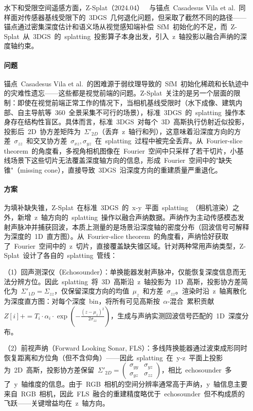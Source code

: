 水下和受限空间遥感方面，Z-Splat（2024.04）~\cite{2404_04687} 与锚点~Casadesus Vila et al.~同样面对传感器基线受限下的~3DGS~几何退化问题，但采取了截然不同的路径——锚点通过密集深度估计和语义场从视觉感知端补偿~SfM~初始化的不足，而~Z-Splat~从~3DGS~的~splatting~投影算子本身出发，引入~z~轴投影以融合声纳的深度轴约束。

\paragraph{问题}锚点~Casadesus Vila et al.~的困难源于弱纹理导致的~SfM~初始化稀疏和长轨迹中的灾难性遗忘——这些都是视觉前端的问题。Z-Splat~关注的是另一个层面的限制：即使在视觉前端正常工作的情况下，当相机基线受限时（水下成像、建筑内部、自主导航等~360\textdegree{}~全景采集不可行的场景），标准~3DGS~的~splatting~操作本身存在结构性盲区。具体而言，标准~3DGS~对每个~3D~高斯执行仿射近似投影，投影后~2D~协方差矩阵为~$\Sigma'_{2D}$（丢弃~z~轴行和列），这意味着沿深度方向的方差~$\sigma_{zz}$~和交叉协方差~$\sigma_{xz}, \sigma_{yz}$~在~splatting~过程中被完全丢弃。从~Fourier-slice theorem~的角度看，多视角相机图像在~Fourier~空间中只采样了若干切片，小基线场景下这些切片无法覆盖深度轴方向的信息，形成~Fourier~空间中的"缺失锥"（missing cone），直接导致~3DGS~沿深度方向的重建质量严重退化。

\paragraph{方案}为填补缺失锥，Z-Splat~在标准~3DGS~的~x-y~平面~splatting~（相机渲染）之外，新增~z~轴方向的~splatting~操作以融合声纳数据。声纳作为主动传感模态发射声脉冲并捕获回波，本质上测量的是场景沿深度轴的密度分布（回波信号可解释为深度的~1D~直方图）。从~Fourier-slice theorem~的角度看，声纳恰好获取了~Fourier~空间中的~z~切片，直接覆盖缺失锥区域。针对两种常用声纳类型，Z-Splat~设计了各自的~splatting~管线：

（1）回声测深仪（Echosounder）：单换能器发射声脉冲，仅能恢复深度信息而无法分辨方位。因此~splatting~将~3D~高斯沿~z~轴投影为~1D~高斯，投影协方差简化为~$\Sigma'_{1D} = \Sigma_{zz}$，仅保留深度方向的均值~$\mu_z$~和方差~$\sigma_{zz}$。渲染时沿~z~轴离散化为深度直方图：对每个深度~bin，将所有可见高斯按~$\alpha$-混合~累积贡献~$Z[i] += T_i \cdot \alpha_i \cdot \exp(-\frac{(z - \mu_z)^2}{2\sigma_{zz}})$，生成与声纳实测回波信号匹配的~1D~深度分布。

（2）前视声纳（Forward Looking Sonar, FLS）：多线阵换能器通过波束成形同时恢复距离和方位角（但不含仰角）——因此~splatting~在~y-z~平面上投影为~2D~高斯，投影协方差保留~$\Sigma'_{2D} = \begin{pmatrix} \sigma_{yy} & \sigma_{yz} \\ \sigma_{yz} & \sigma_{zz} \end{pmatrix}$，相比~echosounder~多了~y~轴维度的信息。由于~RGB~相机的空间分辨率通常高于声纳，y~轴信息主要来自~RGB~相机，因此~FLS~融合的重建精度略优于~echosounder~但不构成质的飞跃——关键增益均在~z~轴方向。

